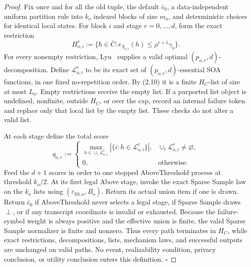 \begin{proof}
Fix once and for all the old tuple, the default \(\bar c_0\), a
data-independent uniform partition rule into \(k_{\mathrm o}\) indexed
blocks of size \(m_{\mathrm o}\), and deterministic choices for identical
local states. For block \(i\) and stage \(r=0,\ldots,d\), form the exact
restriction
\[
H_{\mathrm o,i}^r
:=\{h\in\bar C:
e_{\bar S_{\mathrm o,i}}(h)
\le\rho^{r+1}\gamma_{\mathrm o}\}.
\tag{5.1}
\]
For every nonempty restriction,
Lyu~\citep[Claim~4.1 and Definition~4.3]{lyu2025} supplies a
valid optimal \((p_{\mathrm o,r},d)\)-decomposition. Define
\(\mathcal L_{\mathrm o,i}^r\) to be its exact set of
\((p_{\mathrm o,r},d)\)-essential SOA functions, in one fixed
no-repetition order. By (2.10) it is a finite \(H_C\)-list of size at most
\(L_{\mathrm o}\). Empty restrictions receive the empty list. If a
  purported list object is undefined, nonfinite, outside \(H_C\), or over
the cap, record an internal failure token and replace only that local list
by the empty list. These checks do not alter a valid list.

At each stage define the total score
\[
q_{\mathrm o,r}:=
\begin{cases}
\displaystyle\max_{h\in\cup_i\mathcal L_{\mathrm o,i}^r}
|\{i:h\in\mathcal L_{\mathrm o,i}^r\}|,&
\cup_i\mathcal L_{\mathrm o,i}^r\ne\varnothing,\\
0,&\text{otherwise}.
\end{cases}
\tag{5.2}
\]
Feed the \(d+1\) scores in order to one stopped AboveThreshold process at
threshold \(k_{\mathrm o}/2\). At its first legal Above stage, invoke the
exact Sparse Sample law on the \(k_{\mathrm o}\) lists using
\((\varepsilon_{\mathrm{SS,o}},B_{\mathrm o})\). Return its actual union
item if one is drawn. Return \(\bar c_0\) if AboveThreshold never selects a
legal stage, if Sparse Sample draws \(\perp\), or if any transcript
coordinate is invalid or exhausted. Because the failure-symbol weight is
always positive and the effective union is finite, the valid Sparse
Sample normalizer is finite and nonzero. Thus every path terminates in
\(H_C\), while exact restrictions, decompositions, lists, mechanism laws,
and successful outputs are unchanged on valid paths. No event,
realizability condition, privacy conclusion, or utility conclusion enters
this definition. \(\square\)


\end{proof}

